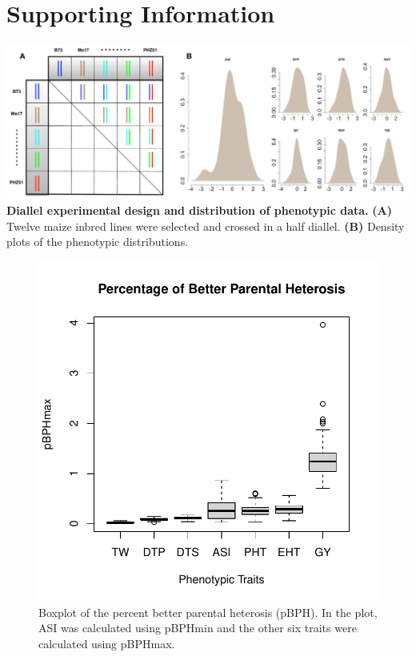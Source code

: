 \documentclass[9pt,twocolumn,twoside]{gsajnl}
\begin{document}
\clearpage



\pagebreak
\beginsupplement
\section*{Supporting Information}

\DIFaddbegin \onecolumn
\DIFaddend \begin{center}\vspace{1cm}
\includegraphics[width=0.8\linewidth]{SFig_pvp.pdf}
{\color{black} \textbf{Diallel experimental design and distribution of phenotypic data.}
\textbf{(A)} Twelve maize inbred lines were selected and crossed in a half diallel. \textbf{(B)} Density plots of the phenotypic distributions.
}
\label{fig:pvp-pheno}
\end{center}\vspace{1cm}

\begin{figure}[htbp]
\centering
\includegraphics[width=\linewidth]{SFig_pBPH.pdf}
\caption{Boxplot of the percent better parental heterosis (pBPH). In the plot, ASI was calculated using pBPHmin and the other six traits were calculated using pBPHmax.}
\label{fig:pBPH}
\end{figure}
\end{document}

